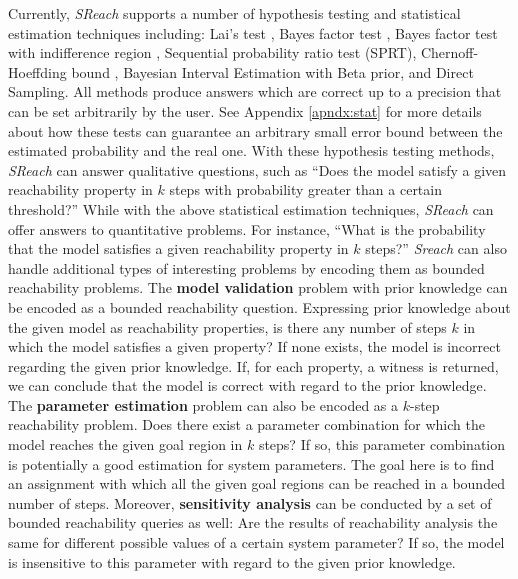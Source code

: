 Currently, {\it SReach} supports a number of hypothesis testing and statistical estimation techniques including: {Lai's test} \cite{lai1988nearly}, {Bayes factor test} \cite{kass1995bayes}, {Bayes factor test with indifference region} \cite{younes2005verification}, {Sequential probability ratio test (SPRT)}\cite{wald1945sequential}, {Chernoff-Hoeffding bound} \cite{hoeffding1963probability}, {Bayesian Interval Estimation with Beta prior}\cite{zuliani2010bayesian}, and {Direct Sampling}. All methods produce answers which are correct up to a precision that can be set arbitrarily by the user. See Appendix \ref{apndx:stat} for more details about how these tests can guarantee an arbitrary small error bound between the estimated probability and the real one. With these hypothesis testing methods, {\it SReach} can answer qualitative questions, such as ``Does the model satisfy a given reachability property in $k$ steps with probability greater than a certain threshold?'' While with the above statistical estimation techniques, {\it SReach} can offer answers to quantitative problems. For instance, ``What is the probability that the model satisfies a given reachability property in $k$ steps?''  {\it Sreach} can also handle additional types of interesting problems by encoding them as bounded reachability problems. The {\bf model validation} problem with prior knowledge can be encoded as a bounded reachability question. Expressing prior knowledge about the given model as reachability properties, is there any number of steps $k$ in which the model satisfies a given property? If none exists, the model is incorrect regarding the given prior knowledge. If, for each property, a witness is returned, we can conclude that the model is correct with regard to the prior knowledge. The {\bf parameter estimation} problem can also be encoded as a $k$-step reachability problem. Does there exist a parameter combination for which the model reaches the given goal region in $k$ steps? If so, this parameter combination is potentially a good estimation for system parameters. The goal here is to find an assignment with which all the given goal regions can be reached in a bounded number of steps. Moreover, {\bf sensitivity analysis} can be conducted by a set of bounded reachability queries as well: Are the results of reachability analysis the same for different possible values of a certain system parameter? If so, the model is insensitive to this parameter with regard to the given prior knowledge.


